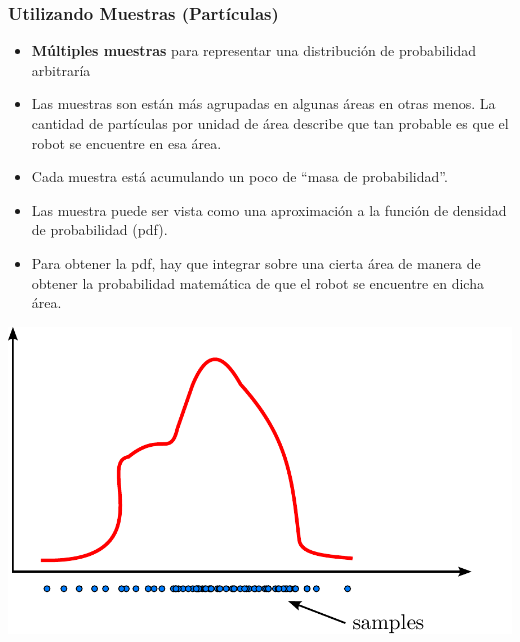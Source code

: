 \begin{frame}
    \frametitle{Utilizando Muestras (Partículas)}
    \footnotesize
    \begin{itemize}
        \item \textbf{Múltiples muestras} para representar una distribución de probabilidad arbitraría
        \item Las muestras son están más agrupadas en algunas áreas en otras menos. La cantidad de partículas por unidad de área describe que tan probable es que el robot se encuentre en esa área.
        \item Cada muestra está acumulando un poco de ``masa de probabilidad''.
        \item Las muestra puede ser vista como una aproximación a la función de densidad de probabilidad (pdf).
        \item Para obtener la pdf, hay que integrar sobre una cierta área de manera de obtener la probabilidad matemática de que el robot se encuentre en dicha área.
    \end{itemize}
    
    \begin{center}
    \includegraphics[width=0.5\columnwidth]{./images/particle_filter/arbitrary_distribution_samples.pdf}
    \end{center}
    
\end{frame}

